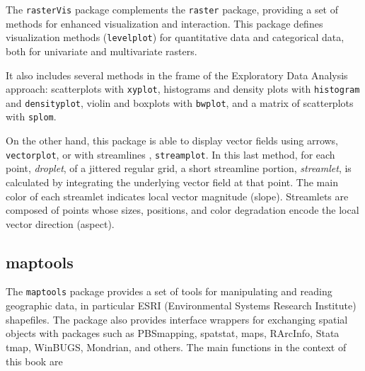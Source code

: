 \documentclass[smallroyalvopaper]{memoir}
\begin{document}
The \texttt{rasterVis} package \cite{Perpinan.Hijmans2013} complements the \texttt{raster} package, providing a set of methods for enhanced visualization and interaction. This package defines visualization methods (\texttt{levelplot}) for quantitative data and categorical data, both for univariate and multivariate rasters.

It also includes several methods in the frame of the Exploratory Data Analysis approach: scatterplots with \texttt{xyplot}, histograms and density plots with \texttt{histogram} and \texttt{densityplot}, violin and boxplots with \texttt{bwplot}, and a matrix of scatterplots with \texttt{splom}.

On the other hand, this package is able to display vector fields using arrows, \texttt{vectorplot}, or with streamlines \cite{Wegenkittl.Groeller1997}, \texttt{streamplot}. In this last method, for each point, \emph{droplet}, of a jittered regular grid, a short streamline portion, \emph{streamlet}, is calculated by integrating the underlying vector field at that point. The main color of each streamlet indicates local vector magnitude (slope). Streamlets are composed of points whose sizes, positions, and color degradation encode the local vector direction (aspect).

\subsection{maptools}
\label{sec:orgheadline27}
\label{sec:maptools}

The \texttt{maptools} package \cite{Bivand.Lewin-Koh2013} provides a set of tools for manipulating and reading geographic data, in particular ESRI (Environmental Systems Research Institute) shapefiles. The package also provides interface wrappers for exchanging spatial objects with packages such as PBSmapping, spatstat, maps, RArcInfo, Stata tmap, WinBUGS, Mondrian, and others. The main functions in the context of this book are
\end{document}
